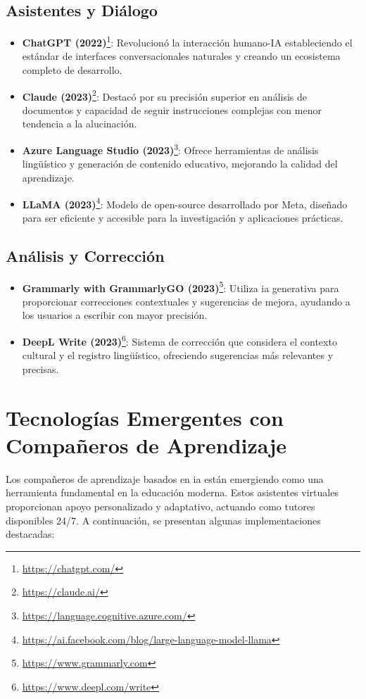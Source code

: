 \subsection{Asistentes y Diálogo}
\begin{itemize}
  \item \textbf{ChatGPT (2022)}\footnote{\url{https://chatgpt.com/}}: Revolucionó la interacción humano-IA estableciendo el estándar de interfaces conversacionales naturales y creando un ecosistema completo de desarrollo.
  \item \textbf{Claude (2023)}\footnote{\url{https://claude.ai/}}: Destacó por su precisión superior en análisis de documentos y capacidad de seguir instrucciones complejas con menor tendencia a la alucinación.
  \item \textbf{Azure Language Studio (2023)}\footnote{\url{https://language.cognitive.azure.com/}}: Ofrece herramientas de análisis lingüístico y generación de contenido educativo, mejorando la calidad del aprendizaje.
  \item \textbf{LLaMA (2023)}\footnote{\url{https://ai.facebook.com/blog/large-language-model-llama}}: Modelo de \gls{open-source} desarrollado por Meta, diseñado para ser eficiente y accesible para la investigación y aplicaciones prácticas.
\end{itemize}

\subsection{Análisis y Corrección}

\begin{itemize}
  \item \textbf{Grammarly with GrammarlyGO (2023)}\footnote{\url{https://www.grammarly.com}}: Utiliza \gls{ia} generativa para proporcionar correcciones contextuales y sugerencias de mejora, ayudando a los usuarios a escribir con mayor precisión.
  \item \textbf{DeepL Write (2023)}\footnote{\url{https://www.deepl.com/write}}: Sistema de corrección que considera el contexto cultural y el registro lingüístico, ofreciendo sugerencias más relevantes y precisas.
\end{itemize}

\section{Tecnologías Emergentes con Compañeros de Aprendizaje}

Los compañeros de aprendizaje basados en \gls{ia} están emergiendo como una herramienta fundamental en la educación moderna. Estos asistentes virtuales proporcionan apoyo personalizado y adaptativo, actuando como tutores disponibles 24/7. A continuación, se presentan algunas implementaciones destacadas:

